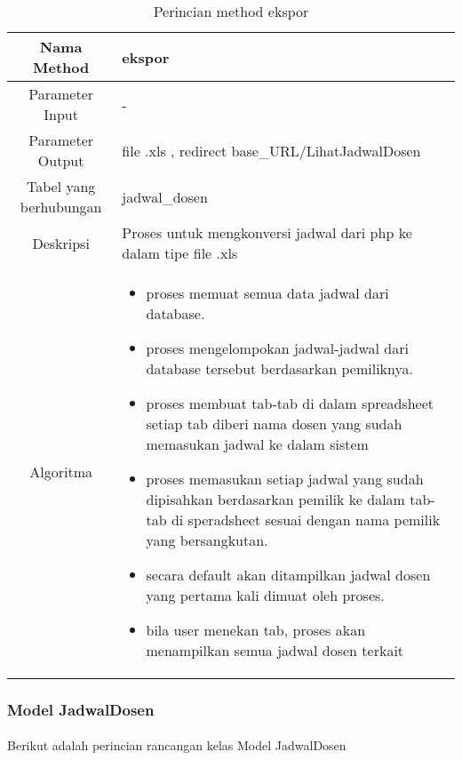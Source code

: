 \begin{center}
\begin{table}[H]
\caption{Perincian method ekspor}
\begin{tabular}{|c|p{11cm}|}
\hline
Nama Method 	& 	ekspor 	\\
\hline
Parameter Input & - \\
\hline
Parameter Output & file .xls , redirect base\_URL/LihatJadwalDosen \\
\hline
Tabel yang berhubungan & jadwal\_dosen \\
\hline
Deskripsi	& Proses untuk mengkonversi jadwal dari php ke dalam tipe file .xls \\
\hline
Algoritma	& \begin{itemize}
				\item proses memuat semua data jadwal dari database.
				\item proses mengelompokan jadwal-jadwal dari database tersebut berdasarkan pemiliknya.
				\item proses membuat tab-tab di dalam spreadsheet setiap tab diberi nama dosen yang sudah memasukan jadwal ke dalam sistem
				\item proses memasukan setiap jadwal yang sudah dipisahkan berdasarkan pemilik ke dalam tab-tab di speradsheet sesuai dengan nama pemilik yang bersangkutan.
				\item secara default akan ditampilkan jadwal dosen yang pertama kali dimuat oleh proses.
				\item bila user menekan tab, proses akan menampilkan semua jadwal dosen terkait
				\end{itemize} \\
\hline
\end{tabular}
\end{table}
\end{center}


\subsubsection{Model JadwalDosen}
\paragraph{} Berikut adalah perincian rancangan kelas Model JadwalDosen

